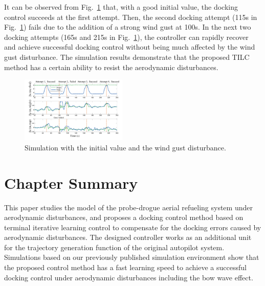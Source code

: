 It can be observed from Fig.~\ref{Fig_compSim} that, with a good
initial value, the docking control succeeds at the first attempt.
Then, the second docking attempt (115s in Fig.~\ref{Fig_compSim})
fails due to the addition of a strong wind gust at 100s. In the next
two docking attempts (165s and 215s in Fig.~\ref{Fig_compSim}),
the controller can rapidly recover and achieve successful docking
control without being much affected by the wind gust disturbance.
The simulation results demonstrate that the proposed TILC method has
a certain ability to resist the aerodynamic disturbances.

\begin{figure}[tbh]
	\centering \includegraphics[width=0.45\textwidth]{Figures/Figs_Ch9/TheFinalRefueling}
	\caption{Simulation with the initial value and the wind gust disturbance.}
	\label{Fig_compSim} 
\end{figure}

\section{Chapter Summary}

\label{Sec-5}

This paper studies the model of the probe-drogue aerial refueling
system under aerodynamic disturbances, and proposes a docking control
method based on terminal iterative learning control to compensate
for the docking errors caused by aerodynamic disturbances. The designed
controller works as an additional unit for the trajectory generation
function of the original autopilot system. Simulations based on our
previously published simulation environment show that the proposed
control method has a fast learning speed to achieve a successful docking
control under aerodynamic disturbances including the bow wave effect.